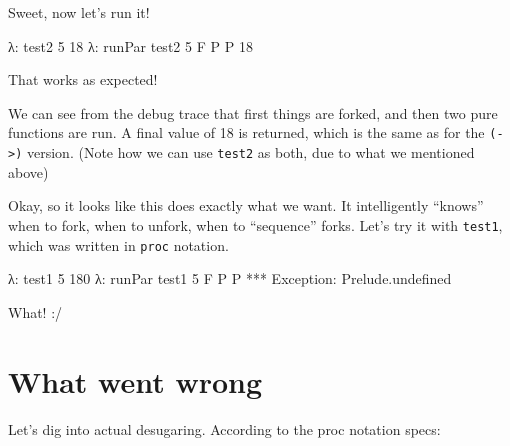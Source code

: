 \documentclass[]{article}
\newenvironment{Shaded}{}{}
\newcommand{\DataTypeTok}[1]{\textcolor[rgb]{0.56,0.13,0.00}{#1}}
\newcommand{\DecValTok}[1]{\textcolor[rgb]{0.25,0.63,0.44}{#1}}
\newcommand{\NormalTok}[1]{#1}
\newcommand{\OperatorTok}[1]{\textcolor[rgb]{0.40,0.40,0.40}{#1}}
\begin{document}
Sweet, now let's run it!

\begin{Shaded}
\begin{Highlighting}[]
\NormalTok{λ}\OperatorTok{:}\NormalTok{ test2 }\DecValTok{5}
\DecValTok{18}
\NormalTok{λ}\OperatorTok{:}\NormalTok{ runPar test2 }\DecValTok{5}
\DataTypeTok{F}
\DataTypeTok{P}
\DataTypeTok{P}
\DecValTok{18}
\end{Highlighting}
\end{Shaded}

That works as expected!

We can see from the debug trace that first things are forked, and then two pure
functions are run. A final value of 18 is returned, which is the same as for the
\texttt{(-\textgreater{})} version. (Note how we can use \texttt{test2} as both,
due to what we mentioned above)

Okay, so it looks like this does exactly what we want. It intelligently
``knows'' when to fork, when to unfork, when to ``sequence'' forks. Let's try it
with \texttt{test1}, which was written in \texttt{proc} notation.

\begin{Shaded}
\begin{Highlighting}[]
\NormalTok{λ}\OperatorTok{:}\NormalTok{ test1 }\DecValTok{5}
\DecValTok{180}
\NormalTok{λ}\OperatorTok{:}\NormalTok{ runPar test1 }\DecValTok{5}
\DataTypeTok{F}
\DataTypeTok{P}
\DataTypeTok{P}
\OperatorTok{***} \DataTypeTok{Exception}\OperatorTok{:}\NormalTok{ Prelude.undefined}
\end{Highlighting}
\end{Shaded}

What! :/

\hypertarget{what-went-wrong}{%
\section{What went wrong}\label{what-went-wrong}}

Let's dig into actual desugaring. According to the proc notation specs:
\end{document}
